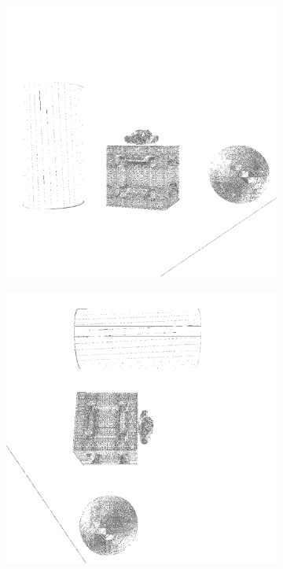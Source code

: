 \begin{figure}[H]
    \begin{subfigure}[t]{0.32\textwidth}
        \includegraphics[width=\linewidth]{chapter04/img/mean-0001.png}
    \end{subfigure}
    \begin{subfigure}[t]{0.32\textwidth}
        \includegraphics[width=\linewidth]{chapter04/img/mean-0030.png}

\end{subfigure}
\end{figure}

